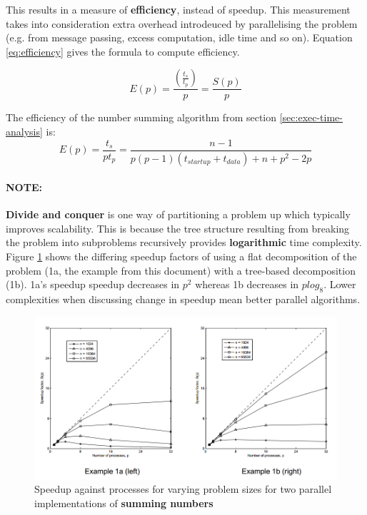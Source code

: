 \documentclass{article}
\begin{document}
This results in a measure of \textbf{efficiency}, instead of speedup. This measurement takes into consideration extra overhead introdeuced by parallelising the problem (e.g. from message passing, excess computation, idle time and so on). Equation \ref{eq:efficiency} gives the formula to compute efficiency.

\begin{equation}
	E(p) = \frac{(\frac{t_s}{t_p})}{p} = \frac{S(p)}{p}
	\label{eq:efficiency}
\end{equation}

The efficiency of the number summing algorithm from section \ref{sec:exec-time-analysis} is:
\begin{equation}
	E(p) = \frac{t_s}{pt_p} = \frac{n - 1}{p(p - 1)(t_{startup} + t_{data}) + n + p^2 - 2p}
\end{equation}

\paragraph{\textbf{NOTE:}} \textbf{Divide and conquer} is one way of partitioning a problem up which typically improves scalability. This is because the tree structure resulting from breaking the problem into subproblems recursively provides \textbf{logarithmic} time complexity. Figure \ref{fig:summing-numbers-speedup} shows the differing speedup factors of using a flat decomposition of the problem (1a, the example from this document) with a tree-based decomposition (1b). 1a's speedup speedup decreases in $p^2$ whereas 1b decreases in $plog_8$. Lower complexities when discussing change in speedup mean better parallel algorithms.

\begin{figure}
	\centering
	\includegraphics[scale=0.5]{figures/summing-numbers-speedup-plots.png}
	\caption{Speedup against processes for varying problem sizes for two parallel implementations of \textbf{summing numbers}}
	\label{fig:summing-numbers-speedup}
\end{figure}
\end{document}
